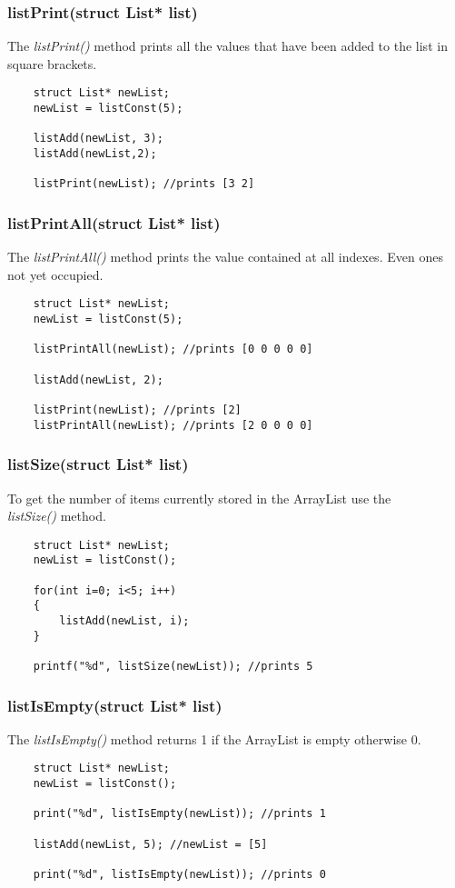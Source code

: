 \documentclass{article}
\begin{document}
\subsubsection*{listPrint(struct List* list)}
The \emph{listPrint()} method prints all the values that have been added to the list in square brackets.
\begin{lstlisting}
    struct List* newList;
    newList = listConst(5);

    listAdd(newList, 3);
    listAdd(newList,2);

    listPrint(newList); //prints [3 2]
\end{lstlisting}

\subsubsection*{listPrintAll(struct List* list)}
The \emph{listPrintAll()} method prints the value contained at all indexes. Even ones not yet occupied.
\begin{lstlisting}
    struct List* newList;
    newList = listConst(5);

    listPrintAll(newList); //prints [0 0 0 0 0]

    listAdd(newList, 2);

    listPrint(newList); //prints [2]
    listPrintAll(newList); //prints [2 0 0 0 0]

\end{lstlisting}

\subsubsection*{listSize(struct List* list)}
To get the number of items currently stored in the ArrayList use the\\
\emph{listSize()} method.
\begin{lstlisting}
    struct List* newList;
    newList = listConst();

    for(int i=0; i<5; i++)
    {
        listAdd(newList, i);
    }

    printf("%d", listSize(newList)); //prints 5
\end{lstlisting}
\newpage
\subsubsection*{listIsEmpty(struct List* list)}
The \emph{listIsEmpty()} method returns 1 if the ArrayList is empty otherwise 0.

\begin{lstlisting}
    struct List* newList;
    newList = listConst();

    print("%d", listIsEmpty(newList)); //prints 1

    listAdd(newList, 5); //newList = [5]

    print("%d", listIsEmpty(newList)); //prints 0
    
\end{lstlisting}
\end{document}
